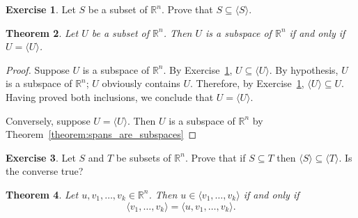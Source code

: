 \documentclass{amsart}
\newcommand{\RR}{\mathbb{R}}
\newtheorem{theorem}{Theorem}[section]
\theoremstyle{definition}
\newtheorem{exercise}[theorem]{Exercise}
\begin{document}
\begin{exercise}\label{exercise:spanners_in_span}
Let $S$ be a subset of $\RR^n$. Prove that $S\subseteq\langle S\rangle$.
\end{exercise}

\begin{theorem}\label{theorem:subspace_means_own_span}
  Let $U$ be a subset of $\RR^n$.
  Then $U$ is a subspace of $\RR^n$ if and only if $U=\langle U\rangle$.
\end{theorem}
\begin{proof}
  Suppose $U$ is a subspace of $\RR^n$.
  By Exercise~\ref{exercise:spanners_in_span}, $U\subseteq\langle U\rangle$.
  By hypothesis, $U$ is a subspace of $\RR^n$; $U$ obviously contains $U$.
  Therefore, by Exercise~\ref{exercise:spanners_in_span}, $\langle U\rangle\subseteq U$.
  Having proved both inclusions, we conclude that $U=\langle U\rangle$.

  Conversely, suppose $U=\langle U\rangle$.
  Then $U$ is a subspace of $\RR^n$ by Theorem~\ref{theorem:spans_are_subspaces}
\end{proof}

\begin{exercise}\label{exercise:span_monotonicity}
  Let $S$ and $T$ be subsets of $\RR^n$. Prove that if $S\subseteq T$ then $\langle S\rangle\subseteq\langle T\rangle$. Is the converse true?
\end{exercise}
\begin{theorem}\label{theorem:span_does_not_grow}
  Let $u,v_1,\ldots,v_k\in\RR^n$. Then $u\in \langle v_1,\ldots,v_k\rangle$ if and only if
\begin{equation}\label{equation:span_monotonicity_1}
  \langle v_1,\ldots,v_k\rangle = \langle u, v_1,\ldots,v_k\rangle.
\end{equation}
\end{theorem}
\end{document}

